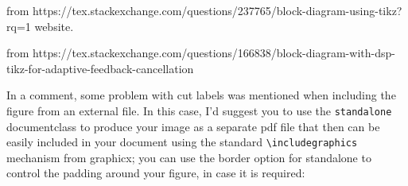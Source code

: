 \documentclass{article}
\begin{document}
\vspace{5ex}
from https://tex.stackexchange.com/questions/237765/block-diagram-using-tikz?rq=1 website.




\vspace{5ex}
from https://tex.stackexchange.com/questions/166838/block-diagram-with-dsp-tikz-for-adaptive-feedback-cancellation

In a comment, some problem with cut labels was mentioned when including the figure from an external file. In this case, I'd suggest you to use the \verb|standalone| documentclass to produce your image as a separate pdf file that then can be easily included in your document using the standard \verb|\includegraphics| mechanism from graphicx; you can use the border option for standalone to control the padding around your figure, in case it is required:
\end{document}
